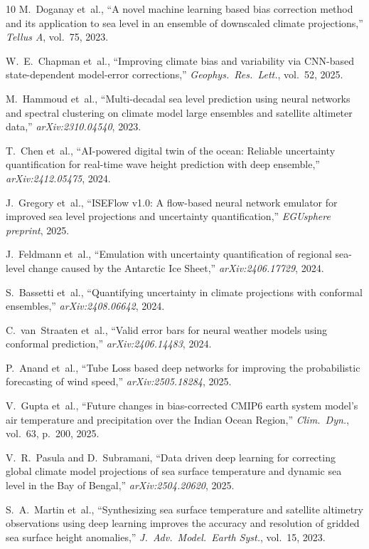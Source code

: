 \documentclass[conference]{IEEEtran}
\begin{document}
\begin{thebibliography}{10}
M.~Doganay et~al., ``A novel machine learning based bias correction method and its application to sea level in an ensemble of downscaled climate projections,'' \emph{Tellus A}, vol.~75, 2023.

W.~E.~Chapman et~al., ``Improving climate bias and variability via CNN-based state-dependent model-error corrections,'' \emph{Geophys.~Res.~Lett.}, vol.~52, 2025.

M.~Hammoud et~al., ``Multi-decadal sea level prediction using neural networks and spectral clustering on climate model large ensembles and satellite altimeter data,'' \emph{arXiv:2310.04540}, 2023.

T.~Chen et~al., ``AI-powered digital twin of the ocean: Reliable uncertainty quantification for real-time wave height prediction with deep ensemble,'' \emph{arXiv:2412.05475}, 2024.

J.~Gregory et~al., ``ISEFlow v1.0: A flow-based neural network emulator for improved sea level projections and uncertainty quantification,'' \emph{EGUsphere preprint}, 2025.

J.~Feldmann et~al., ``Emulation with uncertainty quantification of regional sea-level change caused by the Antarctic Ice Sheet,'' \emph{arXiv:2406.17729}, 2024.

S.~Bassetti et~al., ``Quantifying uncertainty in climate projections with conformal ensembles,'' \emph{arXiv:2408.06642}, 2024.

C.~van~Straaten et~al., ``Valid error bars for neural weather models using conformal prediction,'' \emph{arXiv:2406.14483}, 2024.

P.~Anand et~al., ``Tube Loss based deep networks for improving the probabilistic forecasting of wind speed,'' \emph{arXiv:2505.18284}, 2025.

V.~Gupta et~al., ``Future changes in bias-corrected CMIP6 earth system model's air temperature and precipitation over the Indian Ocean Region,'' \emph{Clim.~Dyn.}, vol.~63, p.~200, 2025.

V.~R.~Pasula and D.~Subramani, ``Data driven deep learning for correcting global climate model projections of sea surface temperature and dynamic sea level in the Bay of Bengal,'' \emph{arXiv:2504.20620}, 2025.

S.~A.~Martin et~al., ``Synthesizing sea surface temperature and satellite altimetry observations using deep learning improves the accuracy and resolution of gridded sea surface height anomalies,'' \emph{J.~Adv.~Model.~Earth Syst.}, vol.~15, 2023.


\end{thebibliography}
\end{document}
